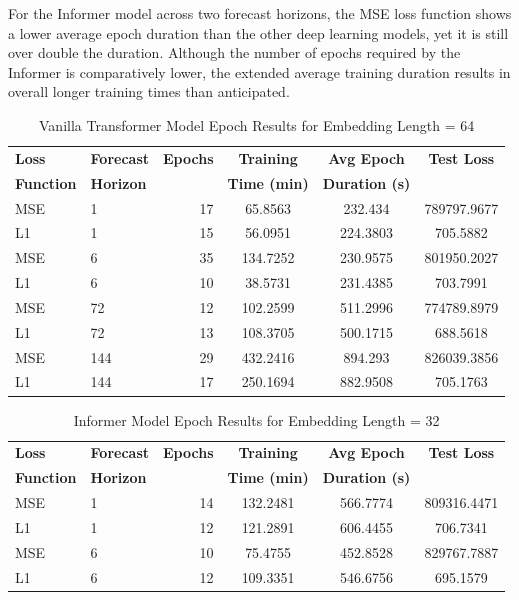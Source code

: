 \documentclass{article}
\begin{document}
For the Informer model across two forecast horizons, the MSE loss function shows a lower average epoch duration than the other deep learning models, yet it is still over double the duration. Although the number of epochs required by the Informer is comparatively lower, the extended average training duration results in overall longer training times than anticipated.

\begin{table}
    \footnotesize
    \centering
    \caption{Vanilla Transformer Model Epoch Results for Embedding Length = 64}
    \begin{tabular}{l|l|r|S|S|S}
        \toprule
        \textbf{Loss} & \textbf{Forecast} & \textbf{Epochs} & \textbf{Training} & \textbf{Avg Epoch} & \textbf{Test Loss} \\
        \textbf{Function} & \textbf{Horizon} & & \textbf{Time (min)} & \textbf{Duration (s)} & \\
        \midrule
            MSE & 1 & 17 & 65.8563 & 232.434 & 789797.9677 \\
        L1 & 1 & 15 & 56.0951 & 224.3803 & 705.5882 \\
        \midrule
        MSE & 6 & 35 & 134.7252 & 230.9575 & 801950.2027 \\
        L1 & 6 & 10 & 38.5731 & 231.4385 & 703.7991 \\
        \midrule
        MSE & 72 & 12 & 102.2599 & 511.2996 & 774789.8979 \\
        L1 & 72 & 13 & 108.3705 & 500.1715 & 688.5618 \\
        \midrule
        MSE & 144 & 29 & 432.2416 & 894.293 & 826039.3856 \\
        L1 & 144 & 17 & 250.1694 & 882.9508 & 705.1763 \\
    \bottomrule
    \end{tabular}
    \label{tab:vanillatransformer_epoch_emb64}
\end{table}

\begin{table}
    \footnotesize
    \centering
    \caption{Informer Model Epoch Results for Embedding Length = 32}
    \begin{tabular}{l|l|r|S|S|S}
        \toprule
        \textbf{Loss} & \textbf{Forecast} & \textbf{Epochs} & \textbf{Training} & \textbf{Avg Epoch} & \textbf{Test Loss} \\
        \textbf{Function} & \textbf{Horizon} & & \textbf{Time (min)} & \textbf{Duration (s)} & \\
        \midrule
            MSE & 1 & 14 & 132.2481 & 566.7774 & 809316.4471 \\
        L1 & 1 & 12 & 121.2891 & 606.4455 & 706.7341 \\
        \midrule
        MSE & 6 & 10 & 75.4755 & 452.8528 & 829767.7887 \\
        L1 & 6 & 12 & 109.3351 & 546.6756 & 695.1579 \\
    \bottomrule
    \end{tabular}
    \label{tab:informer_epoch_emb32}
\end{table}
\end{document}
